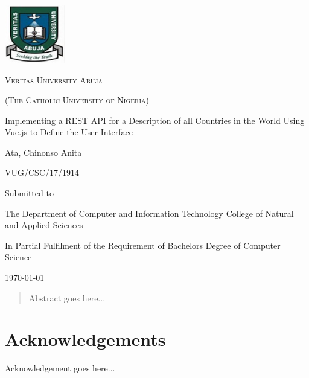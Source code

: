 \documentclass[twoside, a4paper, 12pt]{report}
\begin{document}
\begin{titlepage}
	\centering
	\includegraphics[width=0.2\textwidth]{VeritasUniversityLogo}\par\vspace{1cm}
	{\scshape \LARGE Veritas University Abuja \par}
	{\scshape \Large (The Catholic University of Nigeria) \par}
	\vspace{1cm}
	{\huge Implementing a REST API for a Description of all Countries in the World Using Vue.js to 		Define the User Interface \par}
	\vspace{1.5cm}
	{\Large Ata, Chinonso Anita \par}
	{\Large VUG/CSC/17/1914 \par}
	\vspace{0.5cm}
	Submitted to \par
	\vspace{0.5cm}
	{\Large The Department of Computer and Information Technology College of Natural and Applied 			Sciences \par}
	\vspace{1cm}
	{\Large In Partial Fulfilment of the Requirement of Bachelors Degree of Computer Science \par}
	
	\vfill
	
	{\Large \today \par}
\end{titlepage}

\begin{abstract}
Abstract goes here...
\end{abstract}

\chapter*{Acknowledgements}
Acknowledgement goes here...

\tableofcontents
\newpage
{}

\onehalfspacing
\end{document}

